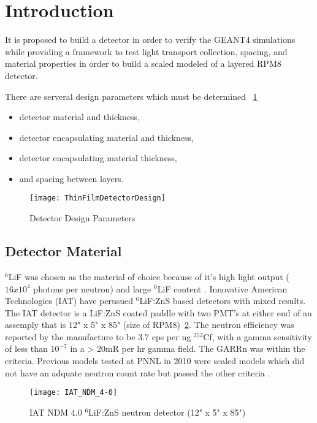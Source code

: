 \section{Introduction}
It is proposed to build a detector in order to verify the GEANT4 simulations while providing a framework to test light transport collection, spacing, and material properties in order to build a scaled modeled of a layered RPM8 detector.

There are serveral design parameters which must be determined ~\ref{fig:DetectorParameterSchematic}
\begin{itemize}
    \item detector material and thickness,
    \item detector encapsulating material and thickness,
    \item detector encapsulating material thickness,
    \item and spacing between layers.
\end{itemize}
\begin{figure}
    \centering
    \texttt{[image: ThinFilmDetectorDesign]}
    \caption{Detector Design Parameters}
    \label{fig:DetectorParameterSchematic}
\end{figure}

\subsection{Detector Material}
${}^6$LiF was chosen as the material of choice because of it's high light output ($16x10^4$ photons per neutron) and large ${}^{6}$LiF content \cite{carel_w.e_inorganic-scintillator_2001}. 
Innovative American Technologies (IAT) have perusued ${}^6$LiF:ZnS based detectors with mixed results.
The IAT detector is a LiF:ZnS coated paddle with two PMT's at either end of an assemply that is 12" x 5" x 85" (size of RPM8)~\ref{fig:IATPaddle}.
The neutron efficiency was reported by the manufacture to be 3.7 cps per ng ${}^{252}$Cf, with a gamma sensitivity of less than $10^{-7}$ in a > 20mR per hr gamma field.  The GARRn was within the criteria.
Previous models tested at PNNL in 2010 were scaled models which did not have an adquate neutron count rate but passed the other criteria \cite{kouzes_lithium_2010}.
\begin{figure}
    \centering
    \texttt{[image: IAT\_NDM\_4-0]}
    \caption{IAT NDM 4.0 ${}^6$LiF:ZnS neutron detector (12" x 5" x 85")}
    \label{fig:IATPaddle}
\end{figure}

